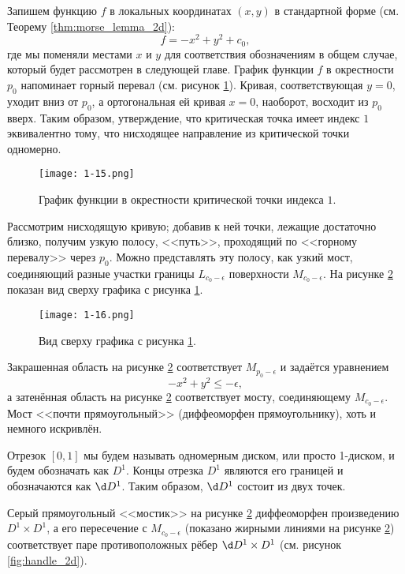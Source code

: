 \documentclass[a4paper,12pt,openany,leqno]{extbook}
\begin{document}

Запишем функцию $f$ в локальных координатах $(x, y)$ в стандартной форме (см. Теорему \ref{thm:morse_lemma_2d}):
\begin{equation}
f = -x^2 + y^2 + c_0,
\end{equation}
где мы поменяли местами $x$ и $y$ для соответствия обозначениям в общем случае, который будет рассмотрен в следующей главе. График функции $f$ в окрестности $p_0$ напоминает горный перевал (см. рисунок \ref{fig:p0_index_one}). Кривая, соответствующая $y = 0$, уходит вниз от $p_0$, а ортогональная ей кривая $x = 0$, наоборот, восходит из $p_0$ вверх. Таким образом, утверждение, что критическая точка имеет индекс $1$ эквивалентно тому, что нисходящее направление из критической точки одномерно.

\begin{figure}[ht]
\texttt{[image: 1-15.png]}
\caption{График функции в окрестности критической точки индекса $1$.}
\label{fig:p0_index_one}
\end{figure}

Рассмотрим нисходящую кривую; добавив к ней точки, лежащие достаточно близко, получим узкую полосу, <<путь>>, проходящий по <<горному перевалу>> через $p_0$. Можно представлять эту полосу, как узкий мост, соединяющий разные участки границы $L_{c_0 - \epsilon}$ поверхности $M_{c_0 - \epsilon}$. На рисунке \ref{fig:p0_index_one_top_view} показан вид сверху графика с рисунка \ref{fig:p0_index_one}.

\begin{figure}[ht]
\texttt{[image: 1-16.png]}
\caption{Вид сверху графика с рисунка \ref{fig:p0_index_one}.}
\label{fig:p0_index_one_top_view}
\end{figure}

Закрашенная область на рисунке \ref{fig:p0_index_one_top_view} соответствует $M_{p_0 - \epsilon}$ и задаётся уравнением
\[
-x^2 + y^2 \leq - \epsilon,
\]
а затенённая область на рисунке \ref{fig:p0_index_one_top_view} соответствует мосту, соединяющему $M_{c_0 - \epsilon}$. Мост <<почти прямоугольный>> (диффеоморфен прямоугольнику), хоть и немного искривлён.

Отрезок $[0, 1]$ мы будем называть одномерным диском, или просто 1-диском, и будем обозначать как $D^1$. Концы отрезка $D^1$ являются его границей и обозначаются как $\d D^1$. Таким образом, $\d D^1$ состоит из двух точек.

Серый прямоугольный <<мостик>> на рисунке \ref{fig:p0_index_one_top_view} диффеоморфен произведению $D^1 \times D^1$, а его пересечение с $M_{c_0 - \epsilon}$ (показано жирными линиями на рисунке \ref{fig:p0_index_one_top_view}) соответствует паре противоположных рёбер $\d D^1 \times D^1$ (см. рисунок \ref{fig:handle_2d}).
\end{document}
